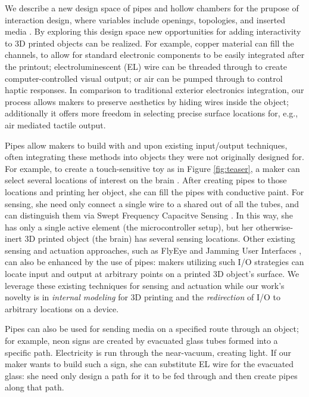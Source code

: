 We describe a new design space of pipes and hollow chambers for the prupose of interaction design, where variables include openings, topologies, and inserted media . By exploring this design space new opportunities for adding interactivity to 3D printed objects can be realized. For example, copper material can fill the channels, to allow for standard electronic components to be easily integrated after the printout; electroluminescent (EL) wire can be threaded through to create computer-controlled visual output; or air can be pumped through to control haptic responses.  In comparison to traditional exterior electronics integration, our process allows makers to preserve aesthetics by hiding wires inside the object; additionally it offers more freedom in selecting precise surface locations for, e.g., air mediated tactile output.

  
Pipes allow makers to build with and upon existing input/output techniques, often integrating these methods into objects they were not originally designed for.   For example, to create a touch-sensitive toy as in Figure \ref{fig:teaser}, a maker can select several locations of interest on the brain .  After creating pipes to those locations and printing her object, she can fill the pipes with conductive paint.  For sensing, she need only connect a single wire to a shared out of all the tubes, and can distinguish them via Swept Frequency Capacitve Sensing \cite{Sato-touche}.  In this way, she has only a single active element (the microcontroller setup), but her otherwise-inert 3D printed object (the brain) has several sensing locations.  Other existing sensing and actuation approaches, such as FlyEye \cite{Wimmer-flyeye} and Jamming User Interfaces \cite{Follmer-jamming}, can also be enhanced by the use of pipes: makers utilizing such I/O strategies can locate input and output at arbitrary points on a printed 3D object's surface.  We leverage these existing techniques for sensing and actuation while our work's novelty is in \emph{internal modeling} for 3D printing and the \emph{redirection} of I/O to arbitrary locations on a device.

   
Pipes can also be used for sending media on a specified route through an object; for example, neon signs are created by evacuated glass tubes formed into a specific path.  Electricity is run through the near-vacuum, creating light.  If our maker wants to build such a sign, she can substitute EL wire for the evacuated glass: she need only design a path for it to be fed through and then create pipes along that path.


